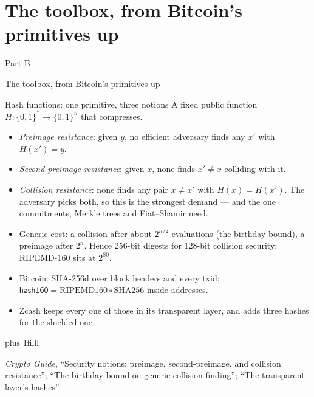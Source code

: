 \documentclass[aspectratio=169,11pt]{beamer}
\newcommand{\divider}[2]{%
  \section{#2}
  \begin{frame}[plain,t]
  \vspace*{14mm}
  {\small\color{arb}#1\par}
  \vskip8mm
  \begin{minipage}{0.88\textwidth}\raggedright
    \fontsize{27}{31}\selectfont #2\par
  \end{minipage}
  \end{frame}}
\newcommand{\src}[1]{\par\vskip0pt plus 1filll
  {\fontsize{6}{7.2}\selectfont\color{arbdim}\raggedright #1\par}}
\begin{document}

\newcommand{\Bahead}[1]{{\small\textcolor{arbdim}{\emph{Ahead:} #1}}}
\newcommand{\Bpers}[1]{\ensuremath{\text{``}\mathtt{#1}\text{''}}}

\divider{Part B}{The toolbox, from Bitcoin's primitives up}

\begin{frame}{Hash functions: one primitive, three notions}
A fixed public function $H \colon \{0,1\}^{*} \to \{0,1\}^{n}$ that
compresses.
\begin{itemize}
  \item \emph{Preimage resistance}: given $y$, no efficient adversary finds
    any $x'$ with $H(x') = y$.
  \item \emph{Second-preimage resistance}: given $x$, none finds
    $x' \ne x$ colliding with it.
  \item \emph{Collision resistance}: none finds any pair $x \ne x'$ with
    $H(x) = H(x')$. The adversary picks both, so this is the strongest
    demand --- and the one commitments, Merkle trees and Fiat--Shamir need.
  \item Generic cost: a collision after about $2^{n/2}$ evaluations (the
    birthday bound), a preimage after $2^{n}$. Hence $256$-bit digests for
    $128$-bit collision security; RIPEMD-160 sits at $2^{80}$.
\end{itemize}
\medskip
\begin{itemize}
  \item Bitcoin: SHA-256d over block headers and every txid;
    $\mathsf{hash160} = \mathrm{RIPEMD160} \circ \mathrm{SHA256}$ inside
    addresses.
  \item Zcash keeps every one of those in its transparent layer, and adds
    three hashes for the shielded one.
\end{itemize}
\src{\emph{Crypto Guide}, ``Security notions: preimage, second-preimage,
  and collision resistance''; ``The birthday bound on generic collision
  finding''; ``The transparent layer's hashes''}
\end{frame}
\end{document}
